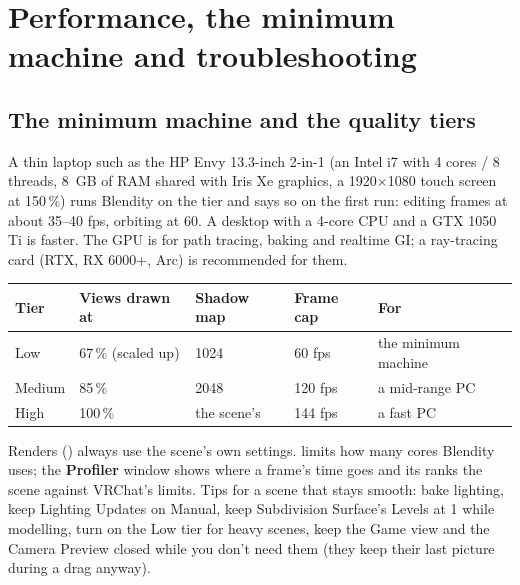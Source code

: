 \chapter{Performance, the minimum machine and troubleshooting}
\label{ch:trouble}

\section{The minimum machine and the quality tiers}
A thin laptop such as the HP Envy 13.3-inch 2-in-1 (an Intel i7 with 4 cores / 8 threads, 8~GB of RAM shared with
Iris Xe graphics, a 1920$\times$1080 touch screen at 150\,\%) runs Blendity on the  tier and says so on the
first run: editing frames at about 35--40 fps, orbiting at 60. A desktop with a 4-core CPU and a GTX 1050 Ti is faster.
The GPU is for path tracing, baking and realtime GI; a ray-tracing card (RTX, RX 6000+, Arc) is recommended for them.

\begin{center}
\begin{tabular}{lllll}
\toprule
Tier & Views drawn at & Shadow map & Frame cap & For \\
\midrule
Low & 67\,\% (scaled up) & 1024 & 60 fps & the minimum machine \\
Medium & 85\,\% & 2048 & 120 fps & a mid-range PC \\
High & 100\,\% & the scene's & 144 fps & a fast PC \\
\bottomrule
\end{tabular}
\end{center}

Renders () always use the scene's own settings.  limits how many cores Blendity uses; the
\textbf{Profiler} window shows where a frame's time goes and its  ranks the scene against VRChat's limits.
Tips for a scene that stays smooth: bake lighting, keep Lighting Updates on Manual, keep Subdivision Surface's Levels
at 1 while modelling, turn on the Low tier for heavy scenes, keep the Game view and the Camera Preview closed while
you don't need them (they keep their last picture during a drag anyway).

